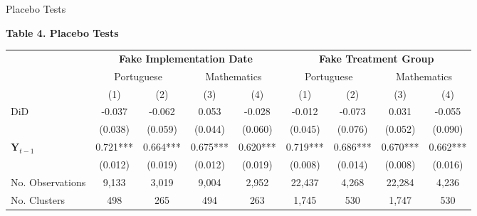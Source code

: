 \documentclass{beamer}
\begin{document}
\begin{frame} {Placebo Tests}
             \begin{table}[h]                                    \label{table:PlaceboTest}                        \centering            \textbf{Table 4. Placebo Tests} \\
\vspace{5pt}                    
\begin{adjustbox}{max width=\textwidth}             
\begin{tabular}{@{\extracolsep{4pt}}l*{8}{c}@{}}             \toprule                    & \multicolumn{4}{c}{\textbf{Fake Implementation Date}} &            \multicolumn{4}{c}{\textbf{Fake Treatment Group}} \\            \cline{2-5}              \cline{6-9}                    & \multicolumn{2}{c}{Portuguese} &                    \multicolumn{2}{c}{Mathematics} &                    \multicolumn{2}{c}{Portuguese} &            \multicolumn{2}{c}{Mathematics} \\            \cline{2-3}                    \cline{4-5}                    \cline{6-7}            \cline{8-9}                    
                    &         (1)   &         (2)   &         (3)   &         (4)   &         (1)   &         (2)   &         (3)   &         (4)   \\
\hline
DiD                 &      -0.037   &      -0.062   &       0.053   &      -0.028   &   -0.012      &   -0.073      &    0.031      &        -0.055 \\
                    &     (0.038)   &     (0.059)   &     (0.044)   &     (0.060)   &   (0.045)     &   (0.076)     &   (0.052)     &       (0.090) \\
$\mathbf{Y}_{t-1}$              &       0.721***&       0.664***&              0.675*** &       0.620***        &  0.719***     &  0.686***     &     0.670***          &    0.662***           \\
                    &     (0.012)   &     (0.019)   &              (0.012) &        (0.019)       &  (0.008)      &   (0.014)     &    (0.008)           &       (0.016)        \\
\hline
No. Observations        &       9,133   &        3,019   &       9,004   &        2,952   &    22,437      &    4,268       &         22,284 &    4,236       \\
No. Clusters          &     498          &    265           &              494 &      263         &    1,745           &       530        &              1,747 &      530         \\

\end{tabular}
\end{adjustbox}
\end{table}
\end{frame}
\end{document}
